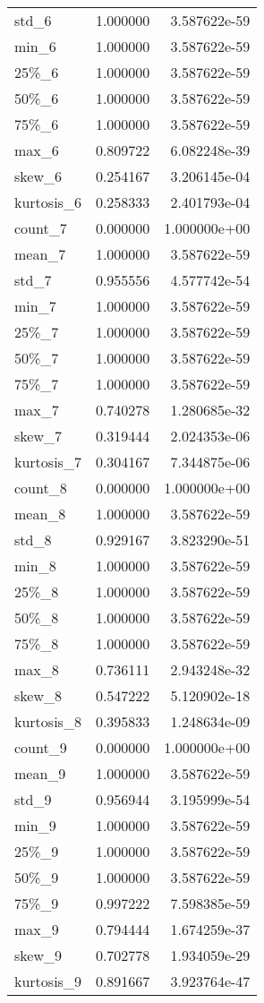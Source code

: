 \begin{tabular}{lrr}
std\_6      &  1.000000 &  3.587622e-59 \\
min\_6      &  1.000000 &  3.587622e-59 \\
25\%\_6      &  1.000000 &  3.587622e-59 \\
50\%\_6      &  1.000000 &  3.587622e-59 \\
75\%\_6      &  1.000000 &  3.587622e-59 \\
max\_6      &  0.809722 &  6.082248e-39 \\
skew\_6     &  0.254167 &  3.206145e-04 \\
kurtosis\_6 &  0.258333 &  2.401793e-04 \\
count\_7    &  0.000000 &  1.000000e+00 \\
mean\_7     &  1.000000 &  3.587622e-59 \\
std\_7      &  0.955556 &  4.577742e-54 \\
min\_7      &  1.000000 &  3.587622e-59 \\
25\%\_7      &  1.000000 &  3.587622e-59 \\
50\%\_7      &  1.000000 &  3.587622e-59 \\
75\%\_7      &  1.000000 &  3.587622e-59 \\
max\_7      &  0.740278 &  1.280685e-32 \\
skew\_7     &  0.319444 &  2.024353e-06 \\
kurtosis\_7 &  0.304167 &  7.344875e-06 \\
count\_8    &  0.000000 &  1.000000e+00 \\
mean\_8     &  1.000000 &  3.587622e-59 \\
std\_8      &  0.929167 &  3.823290e-51 \\
min\_8      &  1.000000 &  3.587622e-59 \\
25\%\_8      &  1.000000 &  3.587622e-59 \\
50\%\_8      &  1.000000 &  3.587622e-59 \\
75\%\_8      &  1.000000 &  3.587622e-59 \\
max\_8      &  0.736111 &  2.943248e-32 \\
skew\_8     &  0.547222 &  5.120902e-18 \\
kurtosis\_8 &  0.395833 &  1.248634e-09 \\
count\_9    &  0.000000 &  1.000000e+00 \\
mean\_9     &  1.000000 &  3.587622e-59 \\
std\_9      &  0.956944 &  3.195999e-54 \\
min\_9      &  1.000000 &  3.587622e-59 \\
25\%\_9      &  1.000000 &  3.587622e-59 \\
50\%\_9      &  1.000000 &  3.587622e-59 \\
75\%\_9      &  0.997222 &  7.598385e-59 \\
max\_9      &  0.794444 &  1.674259e-37 \\
skew\_9     &  0.702778 &  1.934059e-29 \\
kurtosis\_9 &  0.891667 &  3.923764e-47 \\
\bottomrule
\end{tabular}
